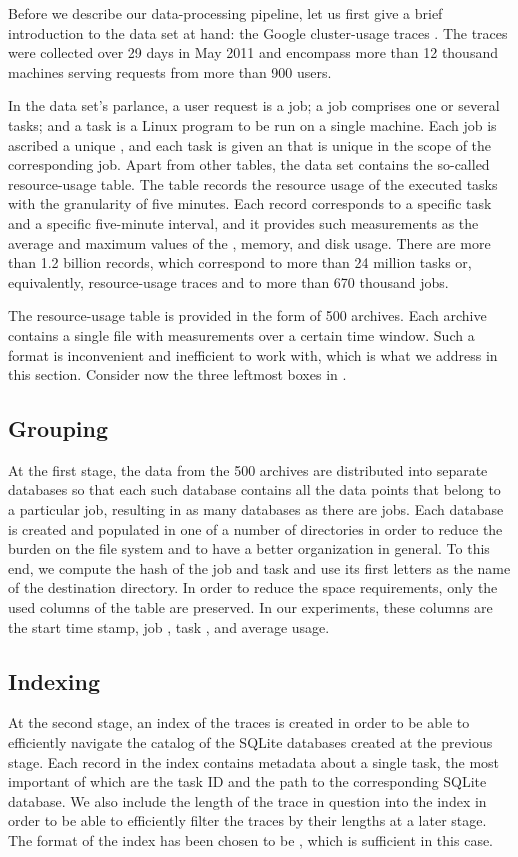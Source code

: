 Before we describe our data-processing pipeline, let us first give a brief
introduction to the data set at hand: the Google cluster-usage traces
\cite{reiss2011}. The traces were collected over 29 days in May 2011 and
encompass more than 12 thousand machines serving requests from more than 900
users.

In the data set's parlance, a user request is a job; a job comprises one or
several tasks; and a task is a Linux program to be run on a single machine.
Each job is ascribed a unique , and each task is given an  that is
unique in the scope of the corresponding job. Apart from other tables, the data
set contains the so-called resource-usage table. The table records the resource
usage of the executed tasks with the granularity of five minutes. Each record
corresponds to a specific task and a specific five-minute interval, and it
provides such measurements as the average and maximum values of the ,
memory, and disk usage. There are more than 1.2 billion records, which
correspond to more than 24 million tasks or, equivalently, resource-usage traces
and to more than 670 thousand jobs.

The resource-usage table is provided in the form of 500 archives. Each archive
contains a single  file with measurements over a certain time window.
Such a format is inconvenient and inefficient to work with, which is what we
address in this section. Consider now the three leftmost boxes in
.

\subsection{Grouping} 
At the first stage, the  data from the 500 archives are distributed into
separate  databases so that each such database contains all the data
points that belong to a particular job, resulting in as many databases as there
are jobs. Each  database is created and populated in one of a number
of directories in order to reduce the burden on the file system and to have a
better organization in general. To this end, we compute the  hash of the
job  and task  and use its first letters as the name of the
destination directory. In order to reduce the space requirements, only the used
columns of the table are preserved. In our experiments, these columns are the
start time stamp, job , task , and average  usage.

\subsection{Indexing} 
At the second stage, an index of the traces is created in order to be able to
efficiently navigate the catalog of the SQLite databases created at the previous
stage. Each record in the index contains metadata about a single task, the most
important of which are the task ID and the path to the corresponding SQLite
database. We also include the length of the trace in question into the index in
order to be able to efficiently filter the traces by their lengths at a later
stage. The format of the index has been chosen to be , which is
sufficient in this case.

